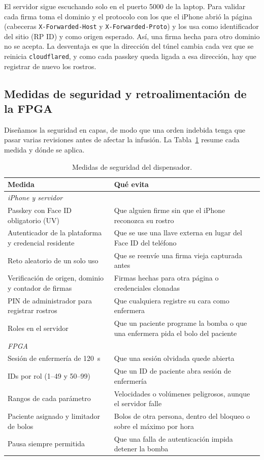\documentclass[11pt,letterpaper]{article}
\newcommand{\code}[1]{\texttt{#1}}
\begin{document}
El servidor sigue escuchando solo en el puerto 5000 de la laptop. Para validar cada firma toma el dominio y el protocolo con los que el iPhone abrió la página (cabeceras \code{X-Forwarded-Host} y \code{X-Forwarded-Proto}) y los usa como identificador del sitio (RP ID) y como origen esperado. Así, una firma hecha para otro dominio no se acepta. La desventaja es que la dirección del túnel cambia cada vez que se reinicia \code{cloudflared}, y como cada passkey queda ligada a esa dirección, hay que registrar de nuevo los rostros.

\subsection{Medidas de seguridad y retroalimentación de la FPGA}\label{sec:seguridad}
Diseñamos la seguridad en capas, de modo que una orden indebida tenga que pasar varias revisiones antes de afectar la infusión. La Tabla~\ref{tab:seguridad} resume cada medida y dónde se aplica.

\begin{table}[H]
\centering
\caption{Medidas de seguridad del dispensador.}
\label{tab:seguridad}
\begin{tabularx}{\linewidth}{lX}
\toprule
\textbf{Medida} & \textbf{Qué evita} \\
\midrule
\multicolumn{2}{l}{\textit{iPhone y servidor}} \\
Passkey con Face ID obligatorio (UV) & Que alguien firme sin que el iPhone reconozca su rostro \\
Autenticador de la plataforma y credencial residente & Que se use una llave externa en lugar del Face ID del teléfono \\
Reto aleatorio de un solo uso & Que se reenvíe una firma vieja capturada antes \\
Verificación de origen, dominio y contador de firmas & Firmas hechas para otra página o credenciales clonadas \\
PIN de administrador para registrar rostros & Que cualquiera registre su cara como enfermera \\
Roles en el servidor & Que un paciente programe la bomba o que una enfermera pida el bolo del paciente \\
\midrule
\multicolumn{2}{l}{\textit{FPGA}} \\
Sesión de enfermería de 120~s & Que una sesión olvidada quede abierta \\
IDs por rol (1--49 y 50--99) & Que un ID de paciente abra sesión de enfermería \\
Rangos de cada parámetro & Velocidades o volúmenes peligrosos, aunque el servidor falle \\
Paciente asignado y limitador de bolos & Bolos de otra persona, dentro del bloqueo o sobre el máximo por hora \\
Pausa siempre permitida & Que una falla de autenticación impida detener la bomba \\
\bottomrule
\end{tabularx}
\end{table}
\end{document}
